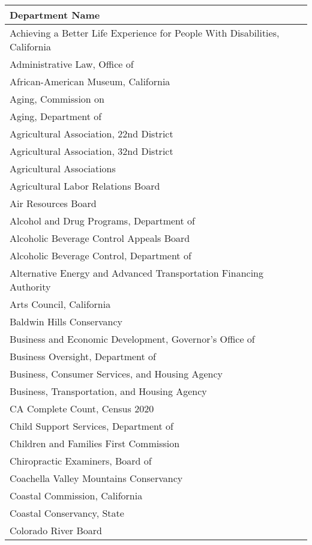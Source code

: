 \documentclass[
]{article}
\begin{document}
\begin{table}
\centering
\begin{tabular}[t]{l}
\hline
Department Name\\
\hline
Achieving a Better Life Experience for People With Disabilities, California\\
\hline
Administrative Law, Office of\\
\hline
African-American Museum, California\\
\hline
Aging, Commission on\\
\hline
Aging, Department of\\
\hline
Agricultural Association, 22nd District\\
\hline
Agricultural Association, 32nd District\\
\hline
Agricultural Associations\\
\hline
Agricultural Labor Relations Board\\
\hline
Air Resources Board\\
\hline
Alcohol and Drug Programs, Department of\\
\hline
Alcoholic Beverage Control Appeals Board\\
\hline
Alcoholic Beverage Control, Department of\\
\hline
Alternative Energy and Advanced Transportation Financing Authority\\
\hline
Arts Council, California\\
\hline
Baldwin Hills Conservancy\\
\hline
Business and Economic Development, Governor's Office of\\
\hline
Business Oversight, Department of\\
\hline
Business, Consumer Services, and Housing Agency\\
\hline
Business, Transportation, and Housing Agency\\
\hline
CA Complete Count, Census 2020\\
\hline
Child Support Services, Department of\\
\hline
Children and Families First Commission\\
\hline
Chiropractic Examiners, Board of\\
\hline
Coachella Valley Mountains Conservancy\\
\hline
Coastal Commission, California\\
\hline
Coastal Conservancy, State\\
\hline
Colorado River Board\\
\hline

\end{tabular}
\end{table}
\end{document}
